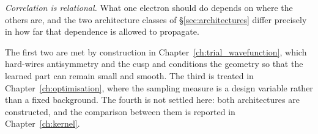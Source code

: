 \emph{Correlation is relational.} What one electron should do depends on where the others
are, and the two architecture classes of \S\ref{sec:architectures} differ precisely in how
far that dependence is allowed to propagate.

The first two are met by construction in Chapter~\ref{ch:trial_wavefunction}, which
hard-wires antisymmetry and the cusp and conditions the geometry so that the learned part
can remain small and smooth. The third is treated in Chapter~\ref{ch:optimisation}, where
the sampling measure is a design variable rather than a fixed background. The fourth is not
settled here: both architectures are constructed, and the comparison between them is
reported in Chapter~\ref{ch:kernel}.

